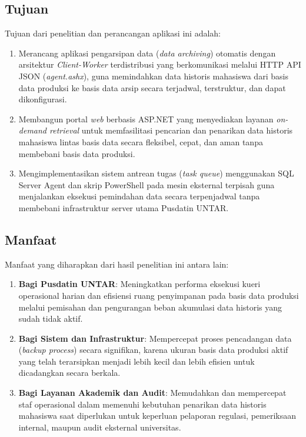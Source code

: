 \subsection{Tujuan}
Tujuan dari penelitian dan perancangan aplikasi ini adalah:
\begin{enumerate}
    \item Merancang aplikasi pengarsipan data (\textit{data archiving}) otomatis dengan arsitektur \textit{Client-Worker} terdistribusi yang berkomunikasi melalui HTTP API JSON (\textit{agent.ashx}), guna memindahkan data historis mahasiswa dari basis data produksi ke basis data arsip secara terjadwal, terstruktur, dan dapat dikonfigurasi.

    \item Membangun portal \textit{web} berbasis ASP.NET yang menyediakan layanan \textit{on-demand retrieval} untuk memfasilitasi pencarian dan penarikan data historis mahasiswa lintas basis data secara fleksibel, cepat, dan aman tanpa membebani basis data produksi.

    \item Mengimplementasikan sistem antrean tugas (\textit{task queue}) menggunakan SQL Server Agent dan skrip PowerShell pada mesin eksternal terpisah guna menjalankan eksekusi pemindahan data secara terpenjadwal tanpa membebani infrastruktur server utama Pusdatin UNTAR.
\end{enumerate}

\subsection{Manfaat}
Manfaat yang diharapkan dari hasil penelitian ini antara lain:
\begin{enumerate}
    \item \textbf{Bagi Pusdatin UNTAR}: Meningkatkan performa eksekusi kueri operasional harian dan efisiensi ruang penyimpanan pada basis data produksi melalui pemisahan dan pengurangan beban akumulasi data historis yang sudah tidak aktif.

    \item \textbf{Bagi Sistem dan Infrastruktur}: Mempercepat proses pencadangan data (\textit{backup process}) secara signifikan, karena ukuran basis data produksi aktif yang telah terarsipkan menjadi lebih kecil dan lebih efisien untuk dicadangkan secara berkala.

    \item \textbf{Bagi Layanan Akademik dan Audit}: Memudahkan dan mempercepat staf operasional dalam memenuhi kebutuhan penarikan data historis mahasiswa saat diperlukan untuk keperluan pelaporan regulasi, pemeriksaan internal, maupun audit eksternal universitas.
\end{enumerate}